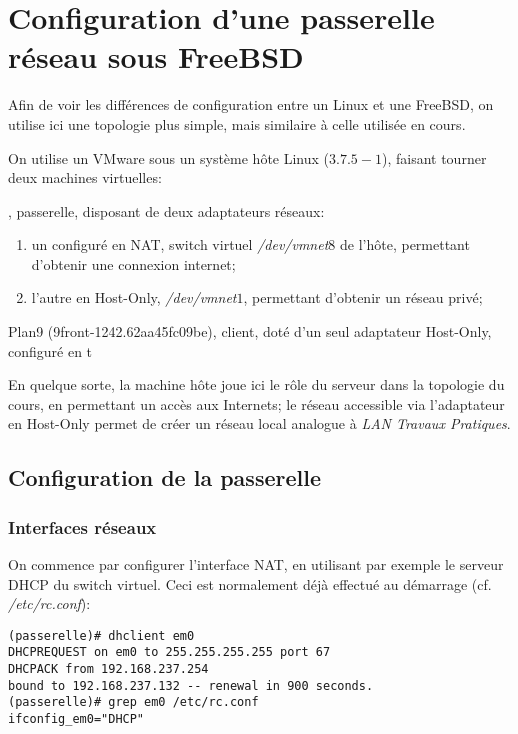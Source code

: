 
\newpage
\appendix

\section{Configuration d'une passerelle réseau sous FreeBSD}
Afin de voir les différences de configuration entre un Linux
et une FreeBSD, on utilise ici une topologie plus simple, mais
similaire à celle utilisée en cours.

On utilise un VMware sous un système hôte Linux ($3.7.5-1$),
faisant tourner deux machines virtuelles:
\begin{description}
	\item[FreeBSD 9.1], passerelle, disposant de deux adaptateurs
	réseaux:
	\begin{enumerate}
		\item un configuré en NAT, switch virtuel
			\textit{/dev/vmnet$8$} de l'hôte, permettant
			d'obtenir une connexion internet;
		\item l'autre en Host-Only, \textit{/dev/vmnet$1$},
			permettant d'obtenir un réseau privé;
	\end{enumerate}
	\item{Plan9 (9front-1242.62aa45fc09be)}, client, doté
		d'un seul adaptateur Host-Only, configuré en t
\end{description}

En quelque sorte, la machine hôte joue ici le rôle du serveur
dans la topologie du cours, en permettant un accès aux Internets;
le réseau accessible via l'adaptateur en Host-Only permet de
créer un réseau local analogue à \textit{LAN Travaux Pratiques}.

\subsection{Configuration de la passerelle}
\subsubsection{Interfaces réseaux}
On commence par configurer l'interface NAT, en utilisant par
exemple le serveur DHCP du switch virtuel. Ceci est normalement
déjà effectué au démarrage (cf. \textit{/etc/rc.conf}):
\begin{verbatim}
(passerelle)# dhclient em0
DHCPREQUEST on em0 to 255.255.255.255 port 67
DHCPACK from 192.168.237.254
bound to 192.168.237.132 -- renewal in 900 seconds.
(passerelle)# grep em0 /etc/rc.conf 
ifconfig_em0="DHCP"
\end{verbatim}

